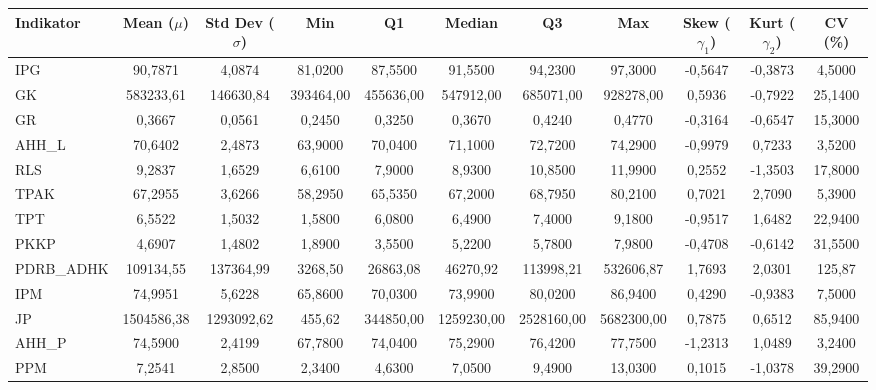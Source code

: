 \begin{adjustbox}{max width=\textwidth}
\small
\begin{tabular}{|>{\centering\arraybackslash}p{2.5cm}|c|c|c|c|c|c|c|c|c|c|}
\hline
\textbf{Indikator} & \textbf{Mean ($\mu$)} & \textbf{Std Dev ($\sigma$)} & \textbf{Min} & \textbf{Q1} & \textbf{Median} & \textbf{Q3} & \textbf{Max} & \textbf{Skew ($\gamma_1$)} & \textbf{Kurt ($\gamma_2$)} & \textbf{CV (\%)} \\
\hline
IPG & 90,7871 & 4,0874 & 81,0200 & 87,5500 & 91,5500 & 94,2300 & 97,3000 & -0,5647 & -0,3873 & 4,5000 \\
GK & 583233,61 & 146630,84 & 393464,00 & 455636,00 & 547912,00 & 685071,00 & 928278,00 & 0,5936 & -0,7922 & 25,1400 \\
GR & 0,3667 & 0,0561 & 0,2450 & 0,3250 & 0,3670 & 0,4240 & 0,4770 & -0,3164 & -0,6547 & 15,3000 \\
AHH\_L & 70,6402 & 2,4873 & 63,9000 & 70,0400 & 71,1000 & 72,7200 & 74,2900 & -0,9979 & 0,7233 & 3,5200 \\
RLS & 9,2837 & 1,6529 & 6,6100 & 7,9000 & 8,9300 & 10,8500 & 11,9900 & 0,2552 & -1,3503 & 17,8000 \\
TPAK & 67,2955 & 3,6266 & 58,2950 & 65,5350 & 67,2000 & 68,7950 & 80,2100 & 0,7021 & 2,7090 & 5,3900 \\
TPT & 6,5522 & 1,5032 & 1,5800 & 6,0800 & 6,4900 & 7,4000 & 9,1800 & -0,9517 & 1,6482 & 22,9400 \\
PKKP & 4,6907 & 1,4802 & 1,8900 & 3,5500 & 5,2200 & 5,7800 & 7,9800 & -0,4708 & -0,6142 & 31,5500 \\
PDRB\_ADHK & 109134,55 & 137364,99 & 3268,50 & 26863,08 & 46270,92 & 113998,21 & 532606,87 & 1,7693 & 2,0301 & 125,87 \\
IPM & 74,9951 & 5,6228 & 65,8600 & 70,0300 & 73,9900 & 80,0200 & 86,9400 & 0,4290 & -0,9383 & 7,5000 \\
JP & 1504586,38 & 1293092,62 & 455,62 & 344850,00 & 1259230,00 & 2528160,00 & 5682300,00 & 0,7875 & 0,6512 & 85,9400 \\
AHH\_P & 74,5900 & 2,4199 & 67,7800 & 74,0400 & 75,2900 & 76,4200 & 77,7500 & -1,2313 & 1,0489 & 3,2400 \\
PPM & 7,2541 & 2,8500 & 2,3400 & 4,6300 & 7,0500 & 9,4900 & 13,0300 & 0,1015 & -1,0378 & 39,2900 \\
\hline
\end{tabular}
\end{adjustbox}
